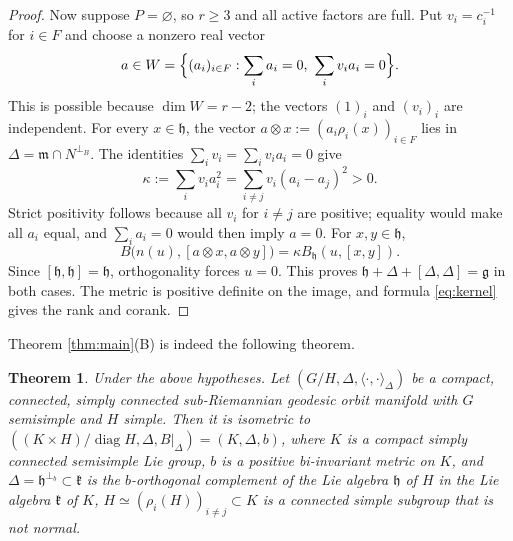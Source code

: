 \documentclass[12pt]{amsart}
\theoremstyle{plain}
\newtheorem{theorem}{Theorem}[section]
\theoremstyle{definition}
\theoremstyle{remark}
\newcommand{\alg}[1]{\mathfrak{#1}}
\newcommand{\diag}{\operatorname{diag}}
\begin{document}
\begin{proof}
Now suppose $P=\varnothing$, so $r\ge3$ and all active factors are full. Put $v_i=c_i^{-1}$ for
$i\in F$ and choose a nonzero real vector
\[ a\in W=\Bigl\{(a_i)_{i\in F}:\sum_i a_i=0,\ \sum_i v_ia_i=0\Bigr\}. \]
This is possible because $\dim W=r-2$; the vectors $(1)_i$ and $(v_i)_i$ are independent. For
every $x\in\alg{h}$, the vector $a\otimes x:=(a_i\rho_i(x))_{i\in F}$ lies in
$\Delta=\alg{m}\cap N^{\perp_B}$. The identities $\sum_i v_i=\sum_i v_ia_i=0$ give
\[ \kappa:=\sum_i v_ia_i^2=\sum_{i\neq j}v_i(a_i-a_j)^2>0. \]
Strict positivity follows because all $v_i$ for $i\neq j$ are positive; equality would make all
$a_i$ equal, and $\sum_i a_i=0$ would then imply $a=0$. For $x,y\in\alg{h}$,
\[ B\big(n(u),[a\otimes x,a\otimes y]\big)=\kappa B_{\alg{h}}(u,[x,y]). \]
Since $[\alg{h},\alg{h}]=\alg{h}$, orthogonality forces $u=0$. This proves
$\alg{h}+\Delta+[\Delta,\Delta]=\alg{g}$ in both cases. The metric is positive definite on the
image, and formula \eqref{eq:kernel} gives the rank and corank.
\end{proof}

Theorem \ref{thm:main}(B) is indeed the following theorem.
\begin{theorem}\label{thm:isom}
Under the above hypotheses. Let $(G/H,\Delta,\langle\cdot,\cdot\rangle_\Delta)$ be a compact, connected, simply connected
 sub-Riemannian geodesic orbit manifold with $G$ semisimple and $H$ simple. Then it is isometric to
$((K\times H)/\diag H,\Delta,B|_{\Delta})=(K,\Delta,b)$, where $K$ is a compact simply connected semisimple Lie group,  $b$ is a positive bi-invariant metric on $K$, and
$\Delta=\alg{h}^{\perp_b}\subset\alg{k}$ is the $b$-orthogonal complement of the Lie algebra
$\alg{h}$ of $H$ in the Lie algebra $\alg{k}$ of $K$,
$H\simeq (\rho_{i}(H))_{i\neq j}\subset K$ is a
connected simple subgroup that is not normal.
\end{theorem}
\end{document}
